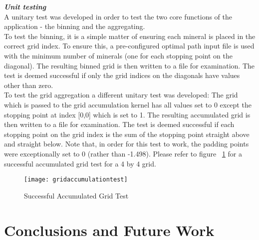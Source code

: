 \documentclass[11pt]{IEEEtran}
\begin{document}
\textbf{\textit{Unit testing}}\\
A unitary test was developed in order to test the two core functions of the application - the binning and the aggregating.\\
To test the binning, it is a simple matter of ensuring each mineral is placed in the correct grid index. To ensure this, a pre-configured optimal path input file is used with the minimum number of minerals (one for each stopping point on the diagonal). The resulting binned grid is then written to a file for examination. The test is deemed successful if only the grid indices on the diagonals have values other than zero.\\
To test the grid aggregation a different unitary test was developed: The grid which is passed to the grid accumulation kernel has all values set to 0 except the stopping point at index [0,0] which is set to 1. The resulting accumulated grid is then written to a file for examination. The test is deemed successful if each stopping point on the grid index is the sum of the stopping point straight above and straight below. Note that, in order for this test to work, the padding points were exceptionally set to 0 (rather than -1.498). Please refer to figure ~\ref{Accumulated Grid Test} for a successful accumulated grid test for a 4 by 4 grid. \\


\begin{figure}[ht]
\begin{center}
\caption{Successful Accumulated Grid Test}
\label{Accumulated Grid Test}
\texttt{[image: gridaccumulationtest]}
\end{center}
\end{figure}

\section{Conclusions and Future Work}
\end{document}
